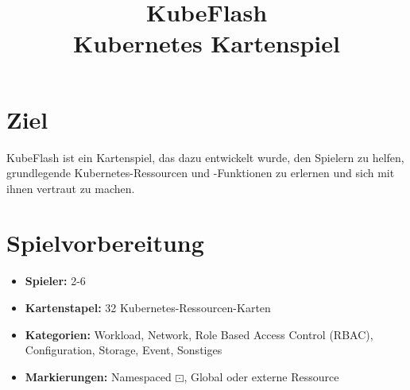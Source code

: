 \documentclass{article}
\title{KubeFlash \\ \large Kubernetes Kartenspiel}
\author{}
\date{}
\begin{document}
\maketitle

\section*{Ziel}
KubeFlash ist ein Kartenspiel, das dazu entwickelt wurde, den Spielern zu helfen, grundlegende Kubernetes-Ressourcen und -Funktionen zu erlernen und sich mit ihnen vertraut zu machen.

\section*{Spielvorbereitung}
\begin{itemize}
    \item \textbf{Spieler:} 2-6
    \item \textbf{Kartenstapel:} 32 Kubernetes-Ressourcen-Karten
    \item \textbf{Kategorien:} Workload, Network, Role Based Access Control (RBAC), Configuration, Storage, Event, Sonstiges
    \item \textbf{Markierungen:} Namespaced {\LARGE$\boxdot$}, Global {\Mundus} oder externe {} Ressource
\end{itemize}
\end{document}
